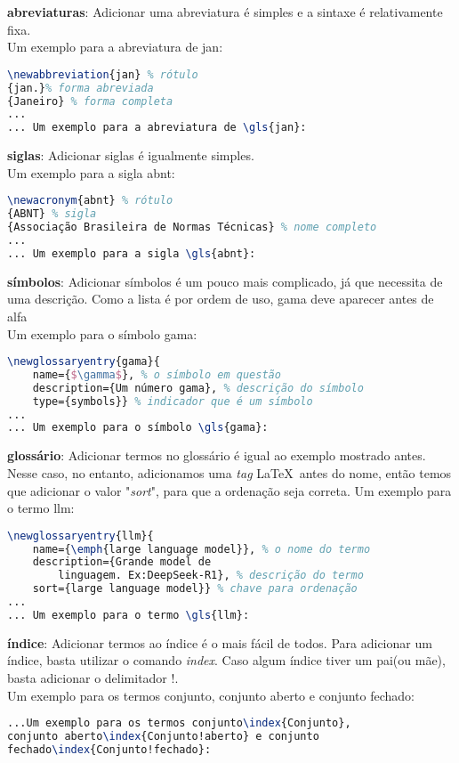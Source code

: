 \begin{alineas}
	\item \textbf{abreviaturas}: Adicionar uma abreviatura é simples e a sintaxe é relativamente fixa.\\ Um exemplo para a abreviatura de \gls{jan}:
		\begin{lstlisting}[language=tex]
\newabbreviation{jan} % rótulo
{jan.}% forma abreviada
{Janeiro} % forma completa
...
... Um exemplo para a abreviatura de \gls{jan}:
		\end{lstlisting}
	
	\item \textbf{siglas}: Adicionar siglas é igualmente simples.\\ 
	Um exemplo para a sigla \gls{abnt}:
	\begin{lstlisting}[language=tex]
\newacronym{abnt} % rótulo
{ABNT} % sigla
{Associação Brasileira de Normas Técnicas} % nome completo
...
... Um exemplo para a sigla \gls{abnt}:
	\end{lstlisting}
	
	\item \textbf{símbolos}: Adicionar símbolos é um pouco mais complicado, já que necessita de uma descrição. Como a lista é por ordem de uso, \gls{gama} deve aparecer antes de \gls{alfa}\\ 
	Um exemplo para o símbolo \gls{gama}:
	\begin{lstlisting}[language=tex]
\newglossaryentry{gama}{
	name={$\gamma$}, % o símbolo em questão
	description={Um número gama}, % descrição do símbolo
	type={symbols}} % indicador que é um símbolo
...
... Um exemplo para o símbolo \gls{gama}:
	\end{lstlisting}
	
	\item \textbf{glossário}: Adicionar termos no glossário é igual ao exemplo mostrado antes.\\
	Nesse caso, no entanto, adicionamos uma \emph{tag} \LaTeX\ antes do nome, então temos que adicionar o valor "\emph{sort}", para que a ordenação seja correta.
	Um exemplo para o termo \gls{llm}:
	\begin{lstlisting}[language=tex]
\newglossaryentry{llm}{
	name={\emph{large language model}}, % o nome do termo
	description={Grande model de 
		linguagem. Ex:DeepSeek-R1}, % descrição do termo
	sort={large language model}} % chave para ordenação
...
... Um exemplo para o termo \gls{llm}:
	\end{lstlisting}
	
	\item \textbf{índice}: Adicionar termos ao índice é o mais fácil de todos. Para adicionar um índice, basta utilizar o comando \emph{index}. Caso algum índice tiver um pai(ou mãe), basta adicionar o delimitador !.\\
	Um exemplo para os termos conjunto, conjunto aberto e conjunto fechado:
	\begin{lstlisting}[language=tex]
...Um exemplo para os termos conjunto\index{Conjunto},
conjunto aberto\index{Conjunto!aberto} e conjunto 
fechado\index{Conjunto!fechado}:
	\end{lstlisting}
	

\end{alineas}
